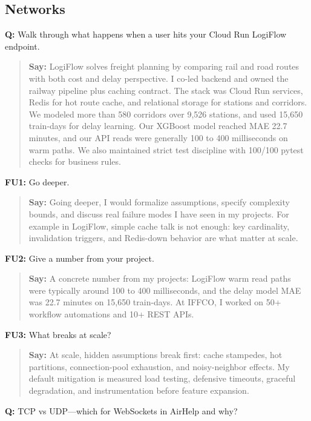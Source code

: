 \documentclass[9pt,a4paper]{article}
\begin{document}
\subsection{Networks}
\textbf{Q:} Walk through what happens when a user hits your Cloud Run LogiFlow endpoint.

\begin{quote}\small\textbf{Say:} LogiFlow solves freight planning by comparing rail and road routes with both cost and delay perspective. I co-led backend and owned the railway pipeline plus caching contract. The stack was Cloud Run services, Redis for hot route cache, and relational storage for stations and corridors. We modeled more than 580 corridors over 9,526 stations, and used 15,650 train-days for delay learning. Our XGBoost model reached MAE 22.7 minutes, and our API reads were generally 100 to 400 milliseconds on warm paths. We also maintained strict test discipline with 100/100 pytest checks for business rules.\end{quote}
\vspace{2mm}
\textbf{FU1:} Go deeper.

\begin{quote}\small\textbf{Say:} Going deeper, I would formalize assumptions, specify complexity bounds, and discuss real failure modes I have seen in my projects. For example in LogiFlow, simple cache talk is not enough: key cardinality, invalidation triggers, and Redis-down behavior are what matter at scale.\end{quote}
\vspace{2mm}
\textbf{FU2:} Give a number from your project.

\begin{quote}\small\textbf{Say:} A concrete number from my projects: LogiFlow warm read paths were typically around 100 to 400 milliseconds, and the delay model MAE was 22.7 minutes on 15,650 train-days. At IFFCO, I worked on 50+ workflow automations and 10+ REST APIs.\end{quote}
\vspace{2mm}
\textbf{FU3:} What breaks at scale?

\begin{quote}\small\textbf{Say:} At scale, hidden assumptions break first: cache stampedes, hot partitions, connection-pool exhaustion, and noisy-neighbor effects. My default mitigation is measured load testing, defensive timeouts, graceful degradation, and instrumentation before feature expansion.\end{quote}
\vspace{2mm}
\textbf{Q:} TCP vs UDP---which for WebSockets in AirHelp and why?
\end{document}
